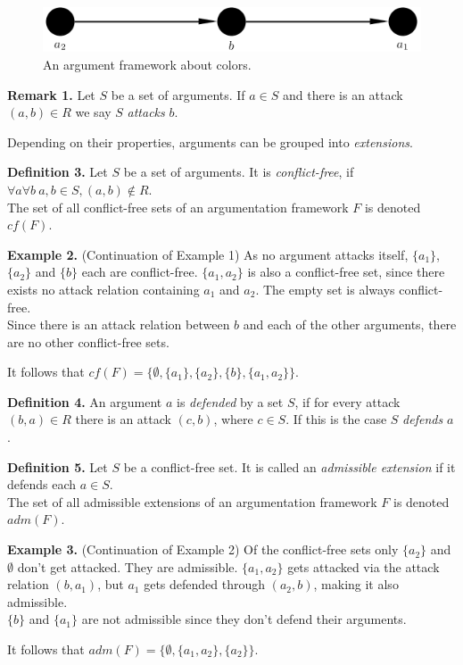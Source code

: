 \documentclass[draft,final]{vutinfth} %
\newcommand{\hl}{\par\medskip}
\newcommand{\dl}{\par\bigskip}
\begin{document}
\FloatBarrier
	\begin{figure}[!htb]
		\centering
		\includegraphics[width=\linewidth]{graphs/ex1.png}
		\caption{An argument framework about colors.}
	\end{figure}
\FloatBarrier

\textbf{Remark 1.} Let $S$ be a set of arguments. If $a\in S$ and there is an attack $(a,b)\in R$ we say $S$ \emph{attacks} $b$.\dl

Depending on their properties, arguments can be grouped into \emph{extensions}.\dl

\textbf{Definition 3.} Let $S$ be a set of arguments. It is \emph{conflict-free}, if $\forall a \forall b\ a,b\in S, (a,b)\notin R$.\\
The set of all conflict-free sets of an argumentation framework $F$ is denoted $cf(F)$.\dl

\textbf{Example 2.} (Continuation of Example 1) As no argument attacks itself, $\{a_1\}$, $\{a_2\}$ and $\{b\}$ each are conflict-free. $\{a_1,a_2\}$ is also a conflict-free set, since there exists no attack relation containing $a_1$ and $a_2$. The empty set is always conflict-free.\\
Since there is an attack relation between $b$ and each of the other arguments, there are no other conflict-free sets.\hl
It follows that $cf(F)=\{\emptyset,\{a_1\},\{a_2\},\{b\},\{a_1,a_2\}\}$.\dl

\textbf{Definition 4.} An argument $a$ is \emph{defended} by a set $S$, if for every attack $(b,a)\in R$ there is an attack $(c,b)$, where $c\in S$. If this is the case $S$ \emph{defends} $a$.\dl

\textbf{Definition 5.} Let $S$ be a conflict-free set. It is called an \emph{admissible extension} if it defends each $a\in S$.\\
The set of all admissible extensions of an argumentation framework $F$ is denoted $adm(F)$.\dl

\textbf{Example 3.} (Continuation of Example 2) Of the conflict-free sets only $\{a_2\}$ and \(\emptyset\) don't get attacked. They are admissible. $\{a_1,a_2\}$ gets attacked via the attack relation $(b,a_1)$, but $a_1$ gets defended through $(a_2,b)$, making it also admissible.\\
$\{b\}$ and $\{a_1\}$ are not admissible since they don't defend their arguments.\hl
It follows that $adm(F)=\{\emptyset,\{a_1,a_2\},\{a_2\}\}$.\dl
\end{document}
